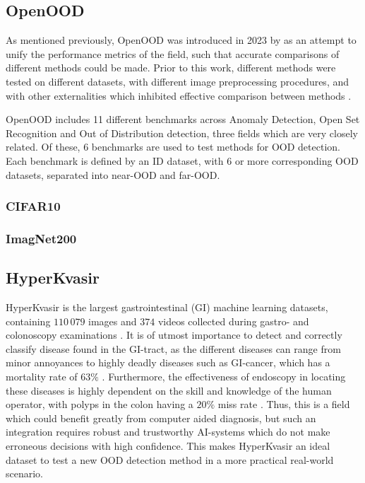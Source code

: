\documentclass[UKenglish]{uiomasterthesis} %
\theoremstyle{definition}
\begin{document}
\subsection{OpenOOD} \label{chapter:openood}

As mentioned previously, OpenOOD was introduced in 2023 by \cite{openood} as an attempt to unify the performance metrics of the field, such that accurate comparisons of different methods could be made. Prior to this work, different methods were tested on different datasets, with different image preprocessing procedures, and with other externalities which inhibited effective comparison between methods \cite{openood}.

OpenOOD includes 11 different benchmarks across Anomaly Detection, Open Set Recognition and Out of Distribution detection, three fields which are very closely related. Of these, 6 benchmarks are used to test methods for OOD detection. Each benchmark is defined by an ID dataset, with 6 or more corresponding OOD datasets, separated into near-OOD and far-OOD.

\subsubsection{CIFAR10}

\subsubsection{ImagNet200}

\subsection{HyperKvasir} \label{chapter:hyperkvasir}

HyperKvasir is the largest gastrointestinal (GI) machine learning datasets, containing $110 \,079$ images and $374$ videos collected during gastro- and colonoscopy examinations \cite{hyperkvasir}. It is of utmost importance to detect and correctly classify disease found in the GI-tract, as the different diseases can range from minor annoyances to highly deadly diseases such as GI-cancer, which has a mortality rate of $63 \%$ \cite{hyperkvasir}. Furthermore, the effectiveness of endoscopy in locating these diseases is highly dependent on the skill and knowledge of the human operator, with polyps in the colon having a $20 \%$ miss rate \cite{kaminski2010quality}. Thus, this is a field which could benefit greatly from computer aided diagnosis, but such an integration requires robust and trustworthy AI-systems which do not make erroneous decisions with high confidence. This makes HyperKvasir an ideal dataset to test a new OOD detection method in a more practical real-world scenario.
\end{document}
